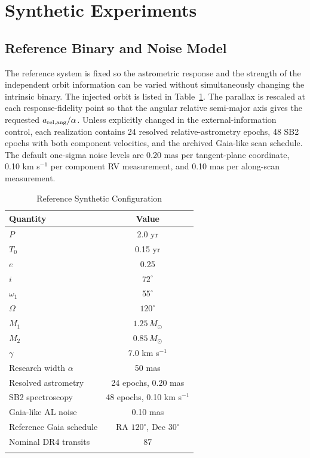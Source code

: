 \section{Synthetic Experiments}
\label{sect:experiments}

\subsection{Reference Binary and Noise Model}

The reference system is fixed so the astrometric response and the strength of the independent orbit information can be varied without simultaneously changing the intrinsic binary. The injected orbit is listed in Table~\ref{tab:setup}. The parallax is rescaled at each response-fidelity point so that the angular relative semi-major axis gives the requested $a_{\rm rel,ang}/\alpha$. Unless explicitly changed in the external-information control, each realization contains 24 resolved relative-astrometry epochs, 48 SB2 epochs with both component velocities, and the archived Gaia-like scan schedule. The default one-sigma noise levels are 0.20 mas per tangent-plane coordinate, 0.10 km s$^{-1}$ per component RV measurement, and 0.10 mas per along-scan measurement.

\begin{table}
\begin{center}
\caption{Reference Synthetic Configuration}\label{tab:setup}
\begin{tabular}{lc}
\hline\noalign{\smallskip}
Quantity & Value\\
\hline\noalign{\smallskip}
$P$ & 2.0 yr\\
$T_0$ & 0.15 yr\\
$e$ & 0.25\\
$i$ & $72^\circ$\\
$\omega_1$ & $55^\circ$\\
$\Omega$ & $120^\circ$\\
$M_1$ & $1.25\,M_\odot$\\
$M_2$ & $0.85\,M_\odot$\\
$\gamma$ & 7.0 km s$^{-1}$\\
Research width $\alpha$ & 50 mas\\
Resolved astrometry & 24 epochs, 0.20 mas\\
SB2 spectroscopy & 48 epochs, 0.10 km s$^{-1}$\\
Gaia-like AL noise & 0.10 mas\\
Reference Gaia schedule & RA $120^\circ$, Dec $30^\circ$\\
Nominal DR4 transits & 87\\
\noalign{\smallskip}\hline
\end{tabular}
\end{center}
\end{table}

